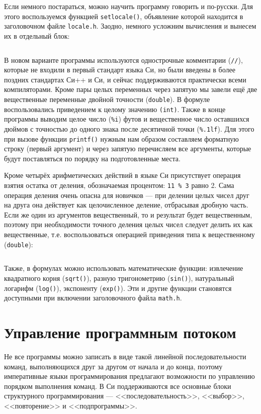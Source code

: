 Если немного постараться, можно научить программу говорить и по-русски. Для
этого воспользуемся функцией \texttt{setlocale()}, объявление которой
находится в заголовочном файле \texttt{locale.h}. Заодно, немного усложним
вычисления и вынесем их в отдельный блок:
%
\inputminted{c}{samples/feet_rus.c}

В новом варианте программы используются однострочные комментарии (\texttt{//}), которые не
входили в первый стандарт языка Си, но были введены в более поздних стандартах
Си++ и Си, и сейчас поддерживаются практически всеми компиляторами.
Кроме пары целых переменных через запятую мы завели ещё две вещественные
переменные двойной точности (\texttt{double}). В формуле воспользовались
приведением к целому значению \verb|(int)|. Также в конце программы выводим
целое число (\verb|%i|) футов и вещественное число оставшихся дюймов с
точностью до одного знака после десятичной точки (\verb|%.1lf|). Для этого при
вызове функции \texttt{printf()} нужным нам образом составляем форматную
строку (первый аргумент) и через запятую перечисляем все аргументы, которые
будут поставляться по порядку на подготовленные места.

Кроме четырёх арифметических действий в языке Си присутствует операция взятия
остатка от деления, обозначаемая процентом: \texttt{11\ \%\ 3} равно 2.
Сама операция деления очень опасна для новичков --- при делении целых чисел
друг на друга она действует как целочисленное деление, отбрасывая дробную часть.
Если же один из аргументов вещественный, то и результат будет вещественным, поэтому
при необходимости точного деления целых чисел следует делить их как вещественные, т.е. воспользоваться операцией
приведения типа к вещественному (\texttt{double}):
%
\inputminted{c}{samples/equation.c}

Также, в формулах можно использовать математические функции: извлечение
квадратного корня (\texttt{sqrt()}), разную тригонометрию (\texttt{sin()}),
натуральный логарифм (\texttt{log()}), экспоненту (\texttt{exp()}). Эти и
другие функции становятся доступными при включении заголовочного файла
\texttt{math.h}.


\section{Управление программным потоком}

Не все программы можно записать в виде такой линейной последовательности
команд, выполняющихся друг за другом от начала и до конца, поэтому
императивные языки программирования предлагают возможности по управлению
порядком выполнения команд. В Си поддерживаются все основные блоки
структурного программирования --- <<последовательность>>, <<выбор>>,
<<повторение>> и <<подпрограммы>>.

